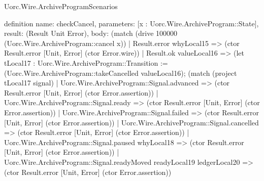 \begin{lexlean}{Uorc.Wire.ArchiveProgramScenarios}
\begin{semanticmodule}
definition{
  name: checkCancel,
  parameters: [x : Uorc.Wire.ArchiveProgram::State],
  result: (Result Unit Error),
  body: (match (drive 100000 (Uorc.Wire.ArchiveProgram::cancel x))
    | Result.error whyLocal15 => (ctor Result.error [Unit, Error] (ctor Error.wire))
    | Result.ok valueLocal16 => (let tLocal17 : Uorc.Wire.ArchiveProgram::Transition := (Uorc.Wire.ArchiveProgram::takeCancelled valueLocal16); (match (project tLocal17 signal)
      | Uorc.Wire.ArchiveProgram::Signal.advanced => (ctor Result.error [Unit, Error] (ctor Error.assertion))
      | Uorc.Wire.ArchiveProgram::Signal.ready => (ctor Result.error [Unit, Error] (ctor Error.assertion))
      | Uorc.Wire.ArchiveProgram::Signal.failed => (ctor Result.error [Unit, Error] (ctor Error.assertion))
      | Uorc.Wire.ArchiveProgram::Signal.cancelled => (ctor Result.error [Unit, Error] (ctor Error.assertion))
      | Uorc.Wire.ArchiveProgram::Signal.paused whyLocal18 => (ctor Result.error [Unit, Error] (ctor Error.assertion))
      | Uorc.Wire.ArchiveProgram::Signal.readyMoved readyLocal19 ledgerLocal20 => (ctor Result.error [Unit, Error] (ctor Error.assertion))
}
\end{semanticmodule}
\end{lexlean}
